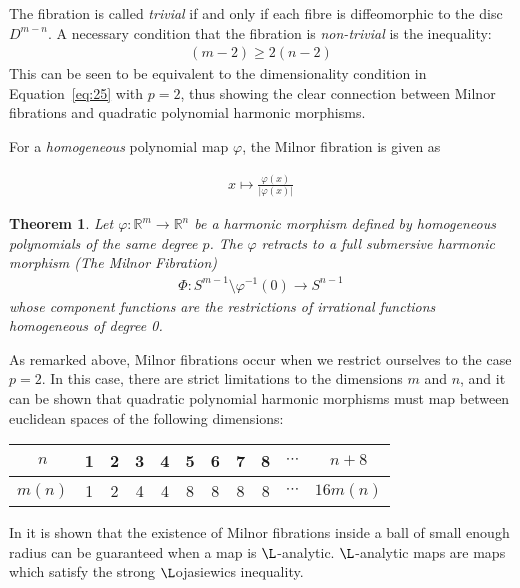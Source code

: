\documentclass[12pt]{article}
\newtheorem{theorem}{Theorem}[section]
\theoremstyle{definition}
\numberwithin{equation}{subsection}
\begin{document}
The fibration is called \textit{trivial} if and only if each fibre is diffeomorphic to the disc $D^{m-n}$. A necessary condition that the fibration is \textit{non-trivial}
 is the inequality:
 \begin{align} \label{eq: MilnorIneq}
     (m-2) \geq 2 (n-2)
 \end{align}
 This can be seen to be equivalent to the dimensionality condition in Equation~\ref{eq:25} with $p = 2$, thus showing the clear connection between Milnor fibrations and quadratic polynomial harmonic morphisms. 
 
For a  \textit{homogeneous} polynomial map $\varphi$, the Milnor fibration is given as

\begin{align}
    x \mapsto \frac{\varphi(x)}{| \varphi(x)|}
\end{align}

\begin{theorem}
Let $\varphi: \mathbb{R}^m \rightarrow \mathbb{R}^n$ be a harmonic morphism defined by homogeneous polynomials of the same degree $p$. The $\varphi$ retracts to a full submersive harmonic morphism (The Milnor Fibration)
\begin{align}
    \Phi: S^{m-1} \setminus \varphi^{-1}(0) \rightarrow S^{n-1}
\end{align}
whose component functions are the restrictions of irrational functions homogeneous of degree 0.
\end{theorem}

As remarked above, Milnor fibrations occur when we restrict ourselves to the case $p = 2$. In this case, there are strict limitations to the dimensions $m$ and $n$, and it can be shown that quadratic polynomial harmonic morphisms must map between euclidean spaces of the following dimensions:


\begin{center}
\begin{tabular}{ccccccccccc}
$n$    & 1 & 2 & 3 & 4 & 5 & 6 & 7 & 8 & $\cdots$ & $n + 8$   \\
\hline $m(n)$ & 1 & 2 & 4 & 4 & 8 & 8 & 8 & 8 & $\cdots$ & $16 m(n)$
\end{tabular}
\end{center}

\indent In \cite{SimpleL} it is shown that the existence of Milnor fibrations inside a ball of small enough radius can be guaranteed when a map is $\L$-analytic.  $\L$-analytic maps are maps which satisfy the strong $\L$ojasiewics inequality.\\
\end{document}
